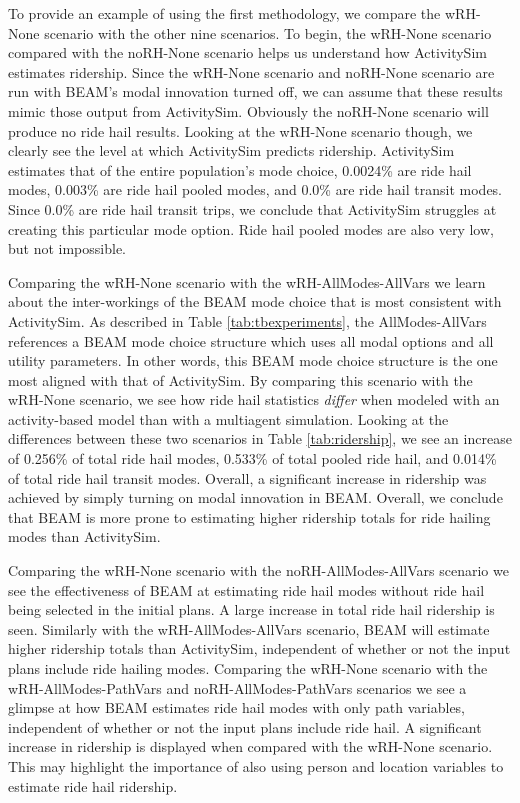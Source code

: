 \documentclass[12pt, oneside, openright]{byuthesis}
\begin{document}
To provide an example of using the first methodology, we compare the wRH-None scenario with the other nine scenarios. To begin, the wRH-None scenario compared with the noRH-None scenario helps us understand how ActivitySim estimates ridership. Since the wRH-None scenario and noRH-None scenario are run with BEAM's modal innovation turned off, we can assume that these results mimic those output from ActivitySim. Obviously the noRH-None scenario will produce no ride hail results. Looking at the wRH-None scenario though, we clearly see the level at which ActivitySim predicts ridership. ActivitySim estimates that of the entire population's mode choice, 0.0024\% are ride hail modes, 0.003\% are ride hail pooled modes, and 0.0\% are ride hail transit modes. Since 0.0\% are ride hail transit trips, we conclude that ActivitySim struggles at creating this particular mode option. Ride hail pooled modes are also very low, but not impossible.

Comparing the wRH-None scenario with the wRH-AllModes-AllVars we learn about the inter-workings of the BEAM mode choice that is most consistent with ActivitySim. As described in Table \ref{tab:tbexperiments}, the AllModes-AllVars references a BEAM mode choice structure which uses all modal options and all utility parameters. In other words, this BEAM mode choice structure is the one most aligned with that of ActivitySim. By comparing this scenario with the wRH-None scenario, we see how ride hail statistics \emph{differ} when modeled with an activity-based model than with a multiagent simulation. Looking at the differences between these two scenarios in Table \ref{tab:ridership}, we see an increase of 0.256\% of total ride hail modes, 0.533\% of total pooled ride hail, and 0.014\% of total ride hail transit modes. Overall, a significant increase in ridership was achieved by simply turning on modal innovation in BEAM. Overall, we conclude that BEAM is more prone to estimating higher ridership totals for ride hailing modes than ActivitySim.

Comparing the wRH-None scenario with the noRH-AllModes-AllVars scenario we see the effectiveness of BEAM at estimating ride hail modes without ride hail being selected in the initial plans. A large increase in total ride hail ridership is seen. Similarly with the wRH-AllModes-AllVars scenario, BEAM will estimate higher ridership totals than ActivitySim, independent of whether or not the input plans include ride hailing modes. Comparing the wRH-None scenario with the wRH-AllModes-PathVars and noRH-AllModes-PathVars scenarios we see a glimpse at how BEAM estimates ride hail modes with only path variables, independent of whether or not the input plans include ride hail. A significant increase in ridership is displayed when compared with the wRH-None scenario. This may highlight the importance of also using person and location variables to estimate ride hail ridership.
\end{document}
